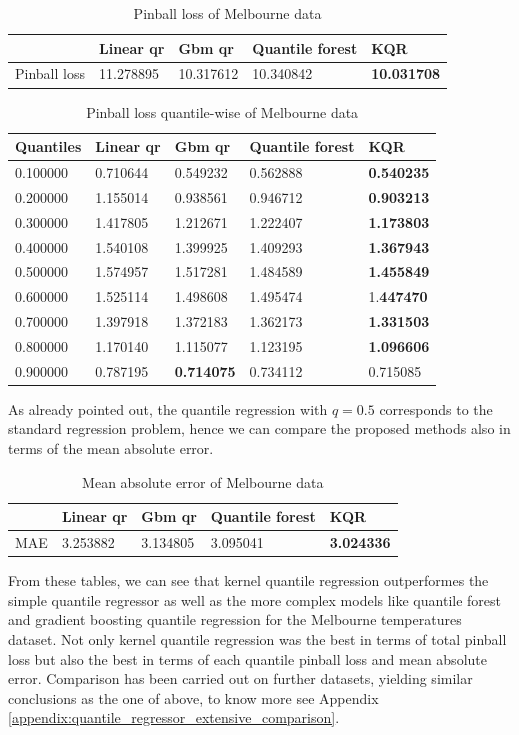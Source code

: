 \begin{table}[!h]
\caption{Pinball loss of Melbourne data}
\begin{tabular}{lllll}
    \toprule
     & Linear qr & Gbm qr & Quantile forest & KQR \\
    \midrule
    Pinball loss & 11.278895 & 10.317612 & 10.340842 & \textbf{10.031708} \\
    \bottomrule
    \end{tabular}
\end{table}

\begin{table}[!h]
    \caption{Pinball loss quantile-wise of Melbourne data}
    \begin{tabular}{lllll}
    \toprule
    Quantiles & Linear qr & Gbm qr & Quantile forest & KQR \\
    \midrule
    0.100000 & 0.710644 & 0.549232 & 0.562888 & \textbf{0.540235} \\
    0.200000 & 1.155014 & 0.938561 & 0.946712 & \textbf{0.903213} \\
    0.300000 & 1.417805 & 1.212671 & 1.222407 & \textbf{1.173803} \\
    0.400000 & 1.540108 & 1.399925 & 1.409293 & \textbf{1.367943} \\
    0.500000 & 1.574957 & 1.517281 & 1.484589 & \textbf{1.455849} \\
    0.600000 & 1.525114 & 1.498608 & 1.495474 & 1.\textbf{447470} \\
    0.700000 & 1.397918 & 1.372183 & 1.362173 & \textbf{1.331503} \\
    0.800000 & 1.170140 & 1.115077 & 1.123195 & \textbf{1.096606} \\
    0.900000 & 0.787195 & \textbf{0.714075} & 0.734112 & 0.715085 \\
    \bottomrule
    \end{tabular}
\end{table}
As already pointed out, the quantile regression with $q=0.5$ corresponds to the standard regression problem, hence we can compare the proposed methods also in terms of the mean absolute error.
\begin{table}[!h]
\caption{Mean absolute error of Melbourne data}
\begin{tabular}{lllll}
    \toprule
     & Linear qr & Gbm qr & Quantile forest & KQR \\
    \midrule
    MAE & 3.253882 & 3.134805 & 3.095041 & \textbf{3.024336} \\
    \bottomrule
    \end{tabular}
\end{table}  
From these tables, we can see that kernel quantile regression outperformes the simple quantile regressor as well as the more complex models like quantile forest and gradient boosting quantile regression for the Melbourne temperatures dataset. Not only kernel quantile regression was the best in terms of total pinball loss but also the best in terms of each quantile pinball loss and mean absolute error.
Comparison has been carried out on further datasets, yielding similar conclusions as the one of above, to know more see Appendix \ref{appendix:quantile_regressor_extensive_comparison}.

